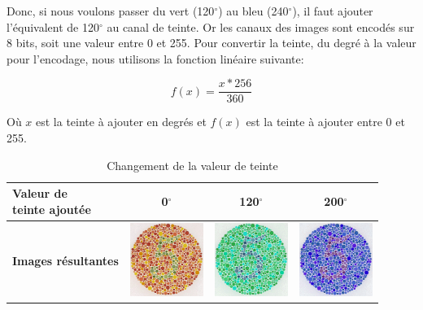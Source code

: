 \documentclass[a4paper,11pt]{article}
\begin{document}
Donc, si nous voulons passer du vert (120$^{\circ}$) au bleu 
(240$^{\circ}$), il faut ajouter l'équivalent de 120$^{\circ}$ au 
canal de teinte. Or les canaux des images sont encodés sur 8 bits, 
soit une valeur entre 0 et 255. Pour convertir la teinte, du degré à la 
valeur pour l'encodage, nous utilisons la fonction linéaire suivante:

\[ f(x) = \frac{x*256}{360} \]

Où $x$ est la teinte à ajouter en degrés et $f(x)$ est la teinte à 
ajouter entre 0 et 255.

\begin{table}[H]
  \begin{center}
  
    \begin{tabular}{|l||c|c|c|}
    
      \hline
      
      \bf \shortstack{ Valeur de \\ teinte ajoutée } &
      0$^{\circ}$ &
      120$^{\circ}$ &
      200$^{\circ}$ \\
      
      \hline
    
      \bf Images résultantes &
      \includegraphics[width=90px]{images/it3_72pp.png} & 
      \includegraphics[width=90px]{images/it3_120.png} & 
      \includegraphics[width=90px]{images/it3_200.png} \\
      
      \hline
    \end{tabular}
    
    \caption{Changement de la valeur de teinte}
    \label{tab:}
    
  \end{center}
\end{table}
\end{document}
